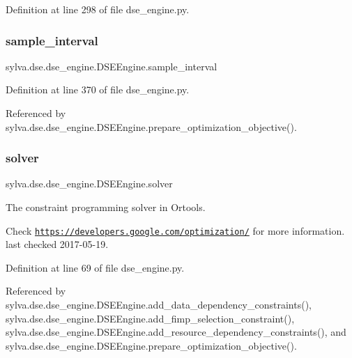 Definition at line 298 of file dse\+\_\+engine.\+py.

\mbox{\label{classsylva_1_1dse_1_1dse__engine_1_1_d_s_e_engine_a1afdcfe12de1556102777e9485c12fc5}} 
\subsubsection{\texorpdfstring{sample\+\_\+interval}{sample\_interval}}
{\footnotesize\ttfamily sylva.\+dse.\+dse\+\_\+engine.\+D\+S\+E\+Engine.\+sample\+\_\+interval}



Definition at line 370 of file dse\+\_\+engine.\+py.



Referenced by sylva.\+dse.\+dse\+\_\+engine.\+D\+S\+E\+Engine.\+prepare\+\_\+optimization\+\_\+objective().

\mbox{\label{classsylva_1_1dse_1_1dse__engine_1_1_d_s_e_engine_ae88035d526d912396088ead223f5a553}} 
\subsubsection{\texorpdfstring{solver}{solver}}
{\footnotesize\ttfamily sylva.\+dse.\+dse\+\_\+engine.\+D\+S\+E\+Engine.\+solver}



The constraint programming solver in Ortools. 

Check \href{https://developers.google.com/optimization/}{\tt https\+://developers.\+google.\+com/optimization/} for more information. last checked 2017-\/05-\/19. 

Definition at line 69 of file dse\+\_\+engine.\+py.



Referenced by sylva.\+dse.\+dse\+\_\+engine.\+D\+S\+E\+Engine.\+add\+\_\+data\+\_\+dependency\+\_\+constraints(), sylva.\+dse.\+dse\+\_\+engine.\+D\+S\+E\+Engine.\+add\+\_\+fimp\+\_\+selection\+\_\+constraint(), sylva.\+dse.\+dse\+\_\+engine.\+D\+S\+E\+Engine.\+add\+\_\+resource\+\_\+dependency\+\_\+constraints(), and sylva.\+dse.\+dse\+\_\+engine.\+D\+S\+E\+Engine.\+prepare\+\_\+optimization\+\_\+objective().

